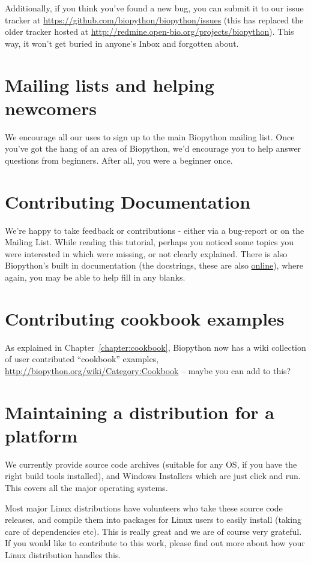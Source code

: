 \documentclass{report}
\begin{document}
Additionally, if you think you've found a new bug, you can submit it to
our issue tracker at \url{https://github.com/biopython/biopython/issues}
(this has replaced the older tracker hosted at
\url{http://redmine.open-bio.org/projects/biopython}).
This way, it won't get buried in anyone's Inbox and forgotten about.

\section{Mailing lists and helping newcomers}

We encourage all our uses to sign up to the main Biopython mailing list.
Once you've got the hang of an area of Biopython, we'd encourage you to
help answer questions from beginners.  After all, you were a beginner once.

\section{Contributing Documentation}

We're happy to take feedback or contributions - either via a bug-report or on the Mailing List.
While reading this tutorial, perhaps you noticed some topics you were interested in which were missing, or not clearly explained.  There is also Biopython's built in documentation (the docstrings, these are also 
\href{http://biopython.org/DIST/docs/api}{online}), where again, you may be able to help fill in any blanks.

\section{Contributing cookbook examples}
As explained in Chapter~\ref{chapter:cookbook}, Biopython now has a wiki
collection of user contributed ``cookbook'' examples,
\url{http://biopython.org/wiki/Category:Cookbook} -- maybe you can add
to this?

\section{Maintaining a distribution for a platform}
\label{sec:maintain_dist}

We currently provide source code archives (suitable for any OS, if you have the right build tools installed), and Windows Installers which are just click and run.  This covers all the major operating systems.

Most major Linux distributions have volunteers who take these source code releases, and compile them into packages for Linux users to easily install (taking care of dependencies etc).  This is really great and we are of course very grateful.  If you would like to contribute to this work, please find out more about how your Linux distribution handles this.
\end{document}
